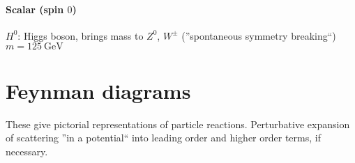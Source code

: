 \paragraph{Scalar (spin $0$)}
\begin{compactitem}
    \item[$H^0$:] Higgs boson, brings mass to $Z^0$, $W^\pm$ (''spontaneous symmetry breaking``)\\
    $m = \SI{125}{\giga\eV}$
\end{compactitem}

\section{Feynman diagrams}
These give pictorial representations of particle reactions. Perturbative expansion of scattering ''in a potential`` into leading order and higher order terms, if necessary.
